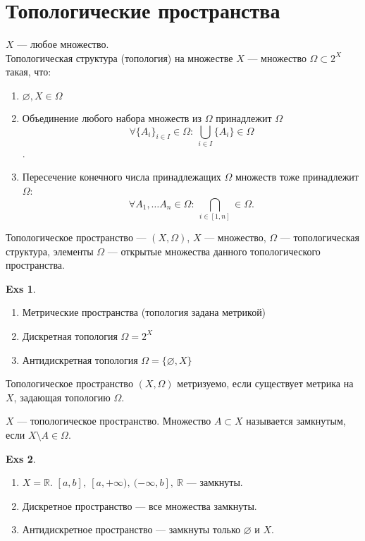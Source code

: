 \documentclass[11pt]{book}
\newcommand{\R}{\mathbb{R}}
\theoremstyle{definition}
\theoremstyle{plain}
\theoremstyle{plain}
\theoremstyle{definition}
\newtheorem*{exs}{Exs}
\theoremstyle{remark}
\begin{document}
\section{Топологические пространства}
\begin{defn}
    $ X$ --- любое множество. \\
    {\sf Топологическая структура (топология)} на множестве $ X$ --- множество  $ \Omega \subset 2^{X}$ такая, что:
    \begin{enumerate}
	\item $ \varnothing, X \in \Omega $
	\item Объединение любого набора множеств из $ \Omega $ принадлежит $ \Omega $
	    $$ \forall \{A_i\}_{i \in I} \in  \Omega : ~ \bigcup_{i \in  I}\{A_i\} \in \Omega  $$.
	\item Пересечение конечного числа принадлежащих $ \Omega $ множеств тоже принадлежит $ \Omega $:
	    \[
		\forall A_1, \ldots A_n \in \Omega : ~ \bigcap_{i \in [1, n]} \in \Omega
	    .\]
    \end{enumerate}
    Топологическое пространство --- $ (X, \Omega )$,
    $ X $ --- множество,  $ \Omega $ --- топологическая структура, элементы $ \Omega $ --- открытые множества данного топологического пространства.
\end{defn}
\begin{exs}
    $ $
    \begin{enumerate}
	\item Метрические пространства (топология задана метрикой)
	\item Дискретная топология  $ \Omega = 2^{X}$
	\item Антидискретная  топология $ \Omega = \{\varnothing, X\}$
    \end{enumerate}
\end{exs}
\begin{defn}
    Топологическое пространство $ (X, \Omega )$ метризуемо, если существует метрика на $ X$, задающая топологию $ \Omega $.
\end{defn}
\begin{defn}
    $ X$ ---  топологическое пространство.
    Множество $ A \subset X$ называется {\sf замкнутым}, если $ X \setminus A \in \Omega $.
\end{defn}
\begin{exs}
    $ $
    \begin{enumerate}
	\item $ X = \R$.  $ [a, b], ~[a, +\infty), ~ (-\infty, b], ~\R$ --- замкнуты.
	\item Дискретное пространство --- все множества замкнуты.
	\item Антидискретное пространство --- замкнуты только  $ \varnothing$ и $ X$.
    \end{enumerate}
\end{exs}
\end{document}
